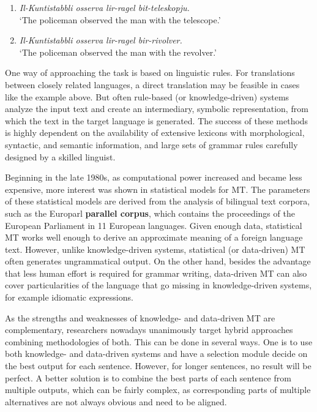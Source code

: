 \documentclass[]{../../metanetpaper}
\begin{document}
\begin{multicols}{2}
\begin{enumerate} %
\item \emph{Il-Kuntistabbli osserva lir-ragel bit-teleskopju.}\\
`The policeman observed the man with the telescope.'
\item \emph{Il-Kuntistabbli osserva lir-ragel bir-rivolver.}\\
`The policeman observed the man with the revolver.'
\end{enumerate}

One way of approaching the task is based on linguistic rules. For translations between closely related languages, a direct translation may be feasible in cases like the example above. But often rule-based (or knowledge-driven) systems analyze the input text and create an intermediary, symbolic representation, from which the text in the target language is generated. The success of these methods is highly dependent on the availability of extensive lexicons with morphological, syntactic, and semantic information, and large sets of grammar rules carefully designed by a skilled linguist.

Beginning in the late 1980s, as computational power increased and became less expensive, more interest was shown in statistical models for MT. The parameters of these statistical models are derived from the analysis of bilingual text corpora, such as the Europarl \textbf{parallel corpus}, which contains the proceedings of the European Parliament in 11 European languages. Given enough data, statistical MT works well enough to derive an approximate meaning of a foreign language text. However, unlike knowledge-driven systems, statistical (or data-driven) MT often generates ungrammatical output. On the other hand, besides the advantage that less human effort is required for grammar writing, data-driven MT can also cover particularities of the language that go missing in knowledge-driven systems, for example idiomatic expressions. 

As the strengths and weaknesses of knowledge- and data-driven MT are complementary, researchers nowadays unanimously target hybrid approaches combining methodologies of both. This can be done in several ways. One is to use both knowledge- and data-driven systems and have a selection module decide on the best output for each sentence. However, for longer sentences, no result will be perfect. A better solution is to combine the best parts of each sentence from multiple outputs, which can be fairly complex, as corresponding parts of multiple alternatives are not always obvious and need to be aligned. 


\end{multicols}
\end{document}

